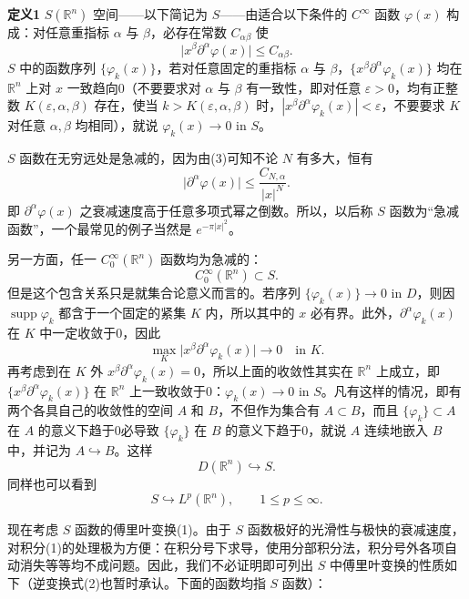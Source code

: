 \noindent\textbf{定义1}\quad
$S(\mathbb R^n)$ 空间——以下简记为 $S$——由适合以下条件的 $C^\infty$ 函数 $\varphi(x)$ 构成：对任意重指标 $\alpha$ 与 $\beta$，必存在常数 $C_{\alpha\beta}$ 使
\begin{equation}
 \bigl|x^\beta\partial^\alpha\varphi(x)\bigr|\le C_{\alpha\beta}.
 \tag{3}
\end{equation}
$S$ 中的函数序列 $\{\varphi_k(x)\}$，若对任意固定的重指标 $\alpha$ 与 $\beta$，$\{x^\beta\partial^\alpha\varphi_k(x)\}$ 均在 $\mathbb R^n$ 上对 $x$ 一致趋向0（不要要求对 $\alpha$ 与 $\beta$ 有一致性，即对任意 $\varepsilon>0$，均有正整数 $K(\varepsilon,\alpha,\beta)$ 存在，使当 $k>K(\varepsilon,\alpha,\beta)$ 时，$|x^\beta\partial^\alpha\varphi_k(x)|<\varepsilon$，不要要求 $K$ 对任意 $\alpha,\beta$ 均相同），就说 $\varphi_k(x)\to0$ in $S$。

$S$ 函数在无穷远处是急减的，因为由(3)可知不论 $N$ 有多大，恒有
\begin{equation}
 \bigl|\partial^\alpha\varphi(x)\bigr|\le\frac{C_{N,\alpha}}{|x|^N}.
 \tag{4}
\end{equation}
即 $\partial^\alpha\varphi(x)$ 之衰减速度高于任意多项式幂之倒数。所以，以后称 $S$ 函数为“急减函数”，一个最常见的例子当然是 $e^{-\pi|x|^2}$。

另一方面，任一 $C_0^\infty(\mathbb R^n)$ 函数均为急减的：
\[
 C_0^\infty(\mathbb R^n)\subset S.
\]
但是这个包含关系只是就集合论意义而言的。若序列 $\{\varphi_k(x)\}\to0$ in $D$，则因 $\operatorname{supp}\varphi_k$ 都含于一个固定的紧集 $K$ 内，所以其中的 $x$ 必有界。此外，$\partial^\alpha\varphi_k(x)$ 在 $K$ 中一定收敛于0，因此
\begin{equation}
 \max_K\bigl|x^\beta\partial^\alpha\varphi_k(x)\bigr|\to0\quad\text{in }K.
 \tag{5}
\end{equation}
再考虑到在 $K$ 外 $x^\beta\partial^\alpha\varphi_k(x)=0$，所以上面的收敛性其实在 $\mathbb R^n$ 上成立，即 $\{x^\beta\partial^\alpha\varphi_k(x)\}$ 在 $\mathbb R^n$ 上一致收敛于0：$\varphi_k(x)\to0$ in $S$。凡有这样的情况，即有两个各具自己的收敛性的空间 $A$ 和 $B$，不但作为集合有 $A\subset B$，而且 $\{\varphi_k\}\subset A$ 在 $A$ 的意义下趋于0必导致 $\{\varphi_k\}$ 在 $B$ 的意义下趋于0，就说 $A$ 连续地嵌入 $B$ 中，并记为 $A\hookrightarrow B$。这样
\[
 D(\mathbb R^n)\hookrightarrow S.
\]
同样也可以看到
\[
 S\hookrightarrow L^p(\mathbb R^n),\qquad 1\le p\le\infty.
\]

现在考虑 $S$ 函数的傅里叶变换(1)。由于 $S$ 函数极好的光滑性与极快的衰减速度，对积分(1)的处理极为方便：在积分号下求导，使用分部积分法，积分号外各项自动消失等等均不成问题。因此，我们不必证明即可列出 $S$ 中傅里叶变换的性质如下（逆变换式(2)也暂时承认。下面的函数均指 $S$ 函数）：

